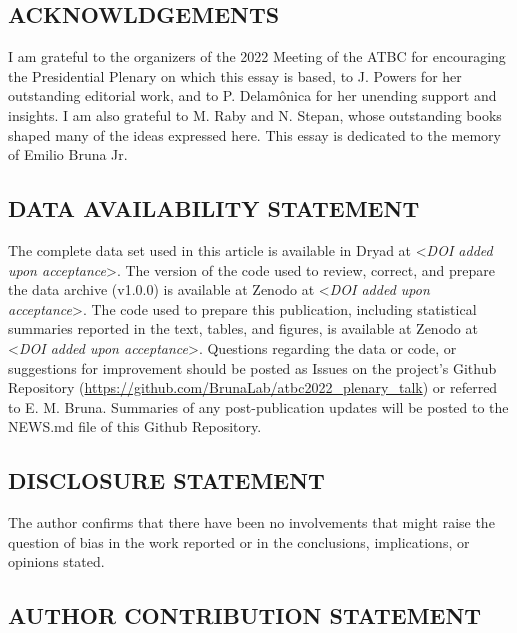 \documentclass[
  12pt,
  man, donotrepeattitle,floatsintext]{apa6}
\begin{document}
\hypertarget{acknowldgements}{%
\subsection{ACKNOWLDGEMENTS}\label{acknowldgements}}

I am grateful to the organizers of the 2022 Meeting of the ATBC for encouraging the Presidential Plenary on which this essay is based, to J. Powers for her outstanding editorial work, and to P. Delamônica for her unending support and insights. I am also grateful to M. Raby and N. Stepan, whose outstanding books shaped many of the ideas expressed here. This essay is dedicated to the memory of Emilio Bruna Jr.

\hypertarget{data-availability-statement}{%
\subsection{DATA AVAILABILITY STATEMENT}\label{data-availability-statement}}

The complete data set used in this article is available in Dryad at \textless{}\emph{DOI added upon acceptance}\textgreater. The version of the code used to review, correct, and prepare the data archive (v1.0.0) is available at Zenodo at \textless{}\emph{DOI added upon acceptance}\textgreater. The code used to prepare this publication, including statistical summaries reported in the text, tables, and figures, is available at Zenodo at \textless{}\emph{DOI added upon acceptance}\textgreater. Questions regarding the data or code, or suggestions for improvement should be posted as Issues on the project's Github Repository (\url{https://github.com/BrunaLab/atbc2022_plenary_talk}) or referred to E. M. Bruna. Summaries of any post-publication updates will be posted to the NEWS.md file of this Github Repository.

\hypertarget{disclosure-statement}{%
\subsection{DISCLOSURE STATEMENT}\label{disclosure-statement}}

The author confirms that there have been no involvements that might raise the question of bias in the work reported or in the conclusions, implications, or opinions stated.

\hypertarget{author-contribution-statement}{%
\subsection{AUTHOR CONTRIBUTION STATEMENT}\label{author-contribution-statement}}
\end{document}
